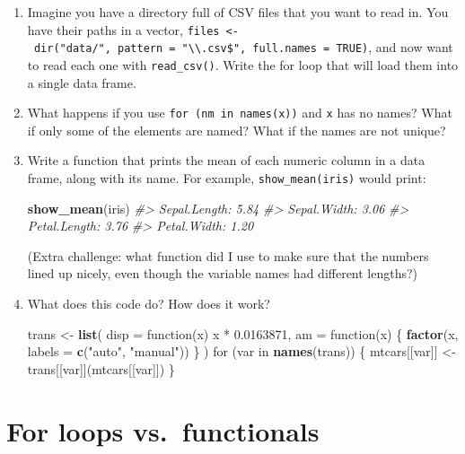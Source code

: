 \documentclass[]{book}
\newenvironment{Shaded}{\begin{snugshade}}{\end{snugshade}}
\newcommand{\KeywordTok}[1]{\textcolor[rgb]{0.13,0.29,0.53}{\textbf{{#1}}}}
\newcommand{\DataTypeTok}[1]{\textcolor[rgb]{0.13,0.29,0.53}{{#1}}}
\newcommand{\FloatTok}[1]{\textcolor[rgb]{0.00,0.00,0.81}{{#1}}}
\newcommand{\StringTok}[1]{\textcolor[rgb]{0.31,0.60,0.02}{{#1}}}
\newcommand{\CommentTok}[1]{\textcolor[rgb]{0.56,0.35,0.01}{\textit{{#1}}}}
\newcommand{\NormalTok}[1]{{#1}}
\begin{document}
\begin{enumerate}
\def\labelenumi{\arabic{enumi}.}
\item
  Imagine you have a directory full of CSV files that you want to read
  in. You have their paths in a vector,
  \texttt{files\ \textless{}-\ dir("data/",\ pattern\ =\ "\textbackslash{}\textbackslash{}.csv\$",\ full.names\ =\ TRUE)},
  and now want to read each one with \texttt{read\_csv()}. Write the for
  loop that will load them into a single data frame.
\item
  What happens if you use \texttt{for\ (nm\ in\ names(x))} and
  \texttt{x} has no names? What if only some of the elements are named?
  What if the names are not unique?
\item
  Write a function that prints the mean of each numeric column in a data
  frame, along with its name. For example, \texttt{show\_mean(iris)}
  would print:

\begin{Shaded}
\begin{Highlighting}[]
\KeywordTok{show_mean}\NormalTok{(iris)}
\CommentTok{#> Sepal.Length: 5.84}
\CommentTok{#> Sepal.Width:  3.06}
\CommentTok{#> Petal.Length: 3.76}
\CommentTok{#> Petal.Width:  1.20}
\end{Highlighting}
\end{Shaded}

  (Extra challenge: what function did I use to make sure that the
  numbers lined up nicely, even though the variable names had different
  lengths?)
\item
  What does this code do? How does it work?

\begin{Shaded}
\begin{Highlighting}[]
\NormalTok{trans <-}\StringTok{ }\KeywordTok{list}\NormalTok{( }
  \DataTypeTok{disp =} \NormalTok{function(x) x *}\StringTok{ }\FloatTok{0.0163871}\NormalTok{,}
  \DataTypeTok{am =} \NormalTok{function(x) \{}
    \KeywordTok{factor}\NormalTok{(x, }\DataTypeTok{labels =} \KeywordTok{c}\NormalTok{(}\StringTok{"auto"}\NormalTok{, }\StringTok{"manual"}\NormalTok{))}
  \NormalTok{\}}
\NormalTok{)}
\NormalTok{for (var in }\KeywordTok{names}\NormalTok{(trans)) \{}
  \NormalTok{mtcars[[var]] <-}\StringTok{ }\NormalTok{trans[[var]](mtcars[[var]])}
\NormalTok{\}}
\end{Highlighting}
\end{Shaded}
\end{enumerate}

\section{For loops vs.~functionals}\label{for-loops-vs.functionals}
\end{document}
